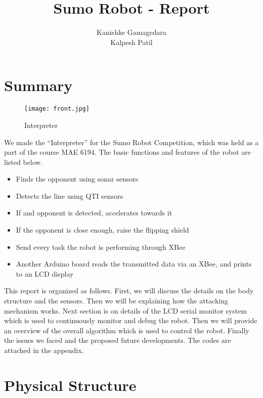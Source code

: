 \documentclass[11pt, letterpaper, oneside]{article}
\title{Sumo Robot - Report}
\author{Kanishke Gamagedara \\ Kalpesh Patil}
\begin{document}

\newpage



\tableofcontents


\newpage
\section{Summary}

\begin{figure}[bth]
	\begin{center}
		\texttt{[image: front.jpg]}
		\caption{Interpreter}
		\label{fig:front}
	\end{center}
\end{figure}

We made the ``Interpreter'' for the Sumo Robot Competition, which was held as a part of the course MAE 6194. The basic functions and features of the robot are listed below.
\begin{itemize}
	\item Finds the opponent using sonar sensors
	\item Detects the line using QTI sensors
	\item If and opponent is detected, accelerates towards it
	\item If the opponent is close enough, raise the flipping shield
	\item Send every task the robot is performing through XBee
	\item Another Arduino board reads the transmitted data via an XBee, and prints to an LCD display
\end{itemize}

This report is organized as follows. First, we will discuss the details on the body structure and the sensors. Then we will be explaining how the attacking mechanism works. Next section is on details of the LCD serial monitor system which is used to continuously monitor and debug the robot. Then we will provide an overview of the overall algorithm which is used to control the robot. Finally the issues we faced and the proposed future developments. The codes are attached in the appendix.


\newpage
\section{Physical Structure}
\end{document}

